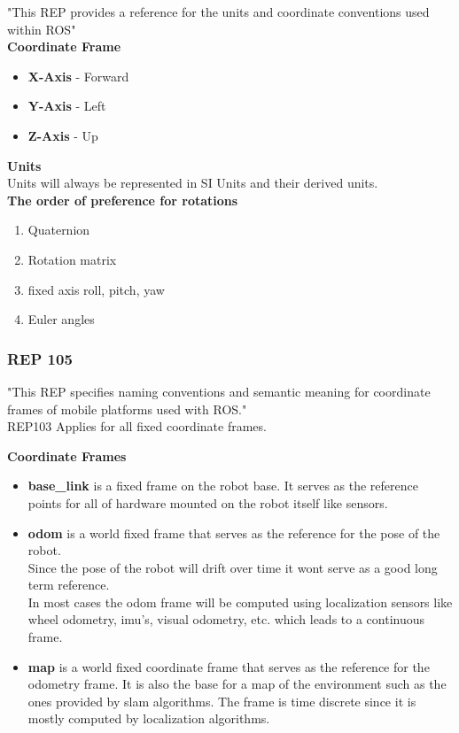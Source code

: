	"This REP provides a reference for the units and coordinate conventions used within ROS"\cite{REP103}\\  
	
	\textbf{Coordinate Frame}
	\begin{itemize}
		\item \textbf{X-Axis} - Forward
		\item \textbf{Y-Axis} - Left
		\item \textbf{Z-Axis} - Up
	\end{itemize}
	
	\textbf{Units}\\
	Units will always be represented in SI Units and their derived units.\\
	
	\textbf{The order of preference for rotations}
	\begin{enumerate}
		\item Quaternion
		\item Rotation matrix
		\item fixed axis roll, pitch, yaw
		\item Euler angles
	\end{enumerate}
	\cite{REP103}
	
\subsubsection{REP 105}
	"This REP specifies naming conventions and semantic meaning for coordinate frames of mobile platforms used with ROS."\cite{REP105}\\
	
	REP103 Applies for all fixed coordinate frames.
	
	\textbf{Coordinate Frames}
	\begin{itemize}
		\item \textbf{base\_link} is a fixed frame on the robot base. It serves as the reference points for all of hardware mounted on the robot itself like sensors.
		\item \textbf{odom} is a world fixed frame that serves as the reference for the pose of the robot.\\ Since the pose of the robot will drift over time it wont serve as a good long term reference.\\In most cases the odom frame will be computed using localization sensors like wheel odometry, imu's, visual odometry, etc. which leads to a continuous frame.
		\item \textbf{map} is a world fixed coordinate frame that serves as the reference for the odometry frame. It is also the base for a map of the environment such as the ones provided by slam algorithms. The frame is time discrete since it is mostly computed by localization algorithms.
	\end{itemize}
	
